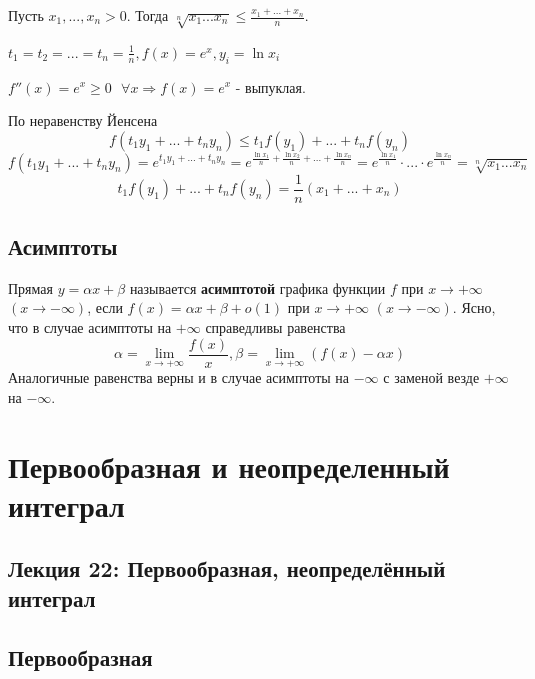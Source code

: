    \begin{example}
    	Пусть $x_1, ..., x_n > 0$. Тогда $\sqrt[n]{x_1 ... x_n} \leqslant \frac{x_1 + ... + x_n}{n}$.
    \end{example}
    
    $t_1 = t_2 = ... = t_n = \frac{1}{n}, f(x) = e^x, y_i = \ln{x_i}$
    
    $f''(x) = e^x \geqslant 0 \text{ } \forall x \Rightarrow f(x) = e^x$ - выпуклая.
    
    По неравенству Йенсена
    \[ f(t_1 y_1 + ... + t_n y_n) \leqslant t_1 f(y_1) + ... + t_n f(y_n) \]
    \[ f(t_1 y_1 + ... + t_n y_n) = e^{t_1 y_1 + ... + t_n y_n} = e^{\frac{\ln{x_1}}{n} + \frac{\ln{x_2}}{n} + ... + \frac{\ln{x_n}}{n}} = e^{\frac{\ln{x_1}}{n}} \cdot ... \cdot e^{\frac{\ln{x_n}}{n}} = \sqrt[n]{x_1 ... x_n} \]
    \[ t_1 f(y_1) + ... + t_n f(y_n) = \frac{1}{n} (x_1 + ... + x_n) \]
    
    \section{Асимптоты}
    
    \begin{definition}
    	Прямая $y = \alpha x + \beta$ называется \textbf{асимптотой} графика функции
    	$f$ при $x \to +\infty$ $(x \to -\infty)$, если $f(x) = \alpha x + \beta + o(1)$ при
    	$x \to +\infty$ $(x \to -\infty)$. Ясно, что в случае асимптоты на $+\infty$
    	справедливы равенства
    	\[ \alpha = \lim_{x \to +\infty} \frac{f(x)}{x}, \beta = \lim_{x \to +\infty} (f(x) - \alpha x) \]
    	Аналогичные равенства верны и в случае асимптоты на $-\infty$ с
    	заменой везде $+\infty$ на $-\infty$.
    \end{definition}
	
	\chapter{Первообразная и неопределенный интеграл}
	
	\section*{Лекция 22: Первообразная, неопределённый интеграл}
	
	\section{Первообразная}
	
